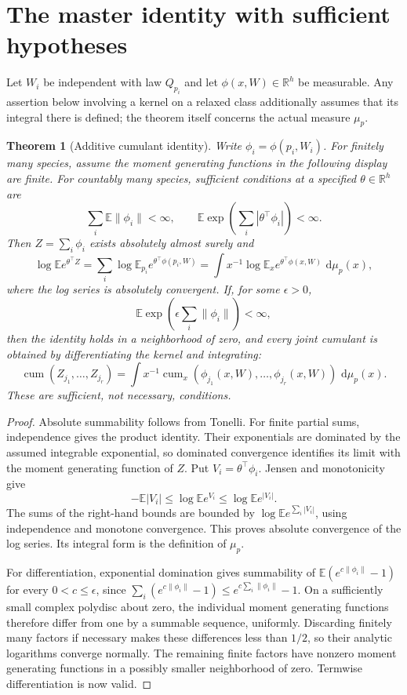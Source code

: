 \documentclass[11pt]{article}
\newtheorem{theorem}{Theorem}[section]
\theoremstyle{remark}\newtheorem{remark}[theorem]{Remark}
\newcommand{\E}{\mathbb E}\newcommand{\PP}{\mathbb P}
\newcommand{\R}{\mathbb R}\newcommand{\N}{\mathbb N}
\newcommand{\dd}{\,\mathrm d}\newcommand{\ind}{\mathbf1}
\begin{document}
\section{The master identity with sufficient hypotheses}
Let $W_i$ be independent with law $Q_{p_i}$ and let
$\phi(x,W)\in\R^h$ be measurable. Any assertion below involving a kernel on
a relaxed class additionally assumes that its integral there is defined;
the theorem itself concerns the actual measure $\mu_p$.

\begin{theorem}[Additive cumulant identity]\label{thm:master}
Write $\phi_i=\phi(p_i,W_i)$. For finitely many species, assume the
moment generating functions in the following display are finite.
For countably many species, sufficient conditions at a specified
$\theta\in\R^h$ are
\[
 \sum_i\E\|\phi_i\|<\infty,\qquad
 \E\exp\!\left(\sum_i|\theta^\top\phi_i|\right)<\infty.
\]
Then $Z=\sum_i\phi_i$ exists absolutely almost surely and
\begin{equation}\label{eq:master}
 \log\E e^{\theta^\top Z}
 =\sum_i\log\E_{p_i}e^{\theta^\top\phi(p_i,W)}
 =\int x^{-1}\log\E_x e^{\theta^\top\phi(x,W)}\,\dd\mu_p(x),
\end{equation}
where the log series is absolutely convergent.
If, for some $\epsilon>0$,
\[
 \E\exp\!\left(\epsilon\sum_i\|\phi_i\|\right)<\infty,
\]
then the identity holds in a neighborhood of zero, and every joint cumulant
is obtained by differentiating the kernel and integrating:
\[
 \operatorname{cum}(Z_{j_1},\ldots,Z_{j_r})
 =\int x^{-1}\operatorname{cum}_x
       (\phi_{j_1}(x,W),\ldots,\phi_{j_r}(x,W))\,\dd\mu_p(x).
\]
These are sufficient, not necessary, conditions.
\end{theorem}
\begin{proof}
Absolute summability follows from Tonelli. For finite partial sums,
independence gives the product identity. Their exponentials are dominated by
the assumed integrable exponential, so dominated convergence identifies its
limit with the moment generating function of $Z$.
Put $V_i=\theta^\top\phi_i$. Jensen and monotonicity give
\[
 -\E|V_i|\le \log\E e^{V_i}\le \log\E e^{|V_i|}.
\]
The sums of the right-hand bounds are bounded by
$\log\E e^{\sum_i|V_i|}$, using independence and monotone convergence.
This proves absolute convergence of the log series. Its integral form is the
definition of $\mu_p$.

For differentiation, exponential domination gives summability of
$\E(e^{c\|\phi_i\|}-1)$ for every $0<c\le\epsilon$, since
$\sum_i(e^{c\|\phi_i\|}-1)\le e^{c\sum_i\|\phi_i\|}-1$.
On a sufficiently small complex polydisc about zero, the individual moment
generating functions therefore differ from one by a summable sequence,
uniformly. Discarding finitely many factors if necessary makes these
differences less than $1/2$, so their analytic logarithms converge normally.
The remaining finite factors have nonzero moment generating functions in a
possibly smaller neighborhood of zero. Termwise differentiation is now valid.
\end{proof}
\end{document}
